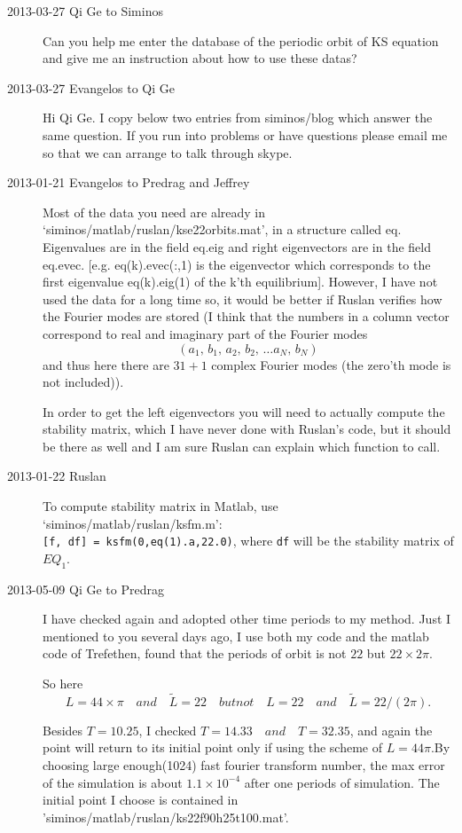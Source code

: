 \begin{description}
\item[2013-03-27 Qi Ge to Siminos]
Can you help me enter the database of the periodic orbit of KS equation and give me an instruction about how to use these datas?


\item[2013-03-27 Evangelos to Qi Ge]
Hi Qi Ge. I copy below two entries from siminos/blog which answer the same question.
If you run into problems or have questions please email me so that we can arrange to talk through skype.


\item[2013-01-21 Evangelos to Predrag and Jeffrey] Most of the data you need are
already in `siminos/matlab/ruslan/kse22orbits.mat', in a structure called eq.
Eigenvalues are in the field eq.eig and right eigenvectors are in the field eq.evec.
[e.g. eq(k).evec(:,1) is the eigenvector which corresponds to the first eigenvalue eq(k).eig(1)
of the k'th equilibrium]. However, I have not used the data for a long time so, it would
be better if Ruslan verifies how the Fourier modes are stored (I think that the numbers
in a column vector correspond to real and imaginary part of the Fourier modes
\[
 (a_1,\, b_1,\, a_2,\, b_2,\, \ldots a_N,\, b_N)
\]
and thus here there are $31+1$ complex Fourier modes (the zero'th mode is not included)).

In order to get the left eigenvectors you will need to actually compute the
stability matrix, which I have never done with Ruslan's code, but it should be
there as well and I am sure Ruslan can explain which function to call.
\item[2013-01-22 Ruslan] To compute stability matrix in Matlab, use `siminos/matlab/ruslan/ksfm.m':\\ {\tt [f, df] = ksfm(0,eq(1).a,22.0)}, where {\tt df} will be the stability matrix of $EQ_1$.

\item[2013-05-09 Qi Ge to Predrag] I have checked again and adopted other time periods to my method. Just I mentioned to you several days ago, I use both my code and the matlab code of Trefethen, found that the periods of orbit is not \(22\) but \(22\times2\pi\).

    So here \begin{equation}L = 44\times{\pi}\quad and \quad \widetilde{L} = 22 \quad but not \quad L = 22 \quad and\quad  \widetilde{L} = 22/(2\pi).\end{equation}

    Besides \(T = 10.25\), I checked \(T = 14.33 \quad and \quad T = 32.35\), and again the point will return to its initial point only if using the scheme of \(L = 44\pi\).By choosing large enough(1024) fast fourier transform number, the max error of the simulation is about \(1.1\times{10^{-4}}\) after one periods of simulation. The initial point I choose is contained in 'siminos/matlab/ruslan/ks22f90h25t100.mat'.


\end{description}

\renewcommand{\ssp}{a}
